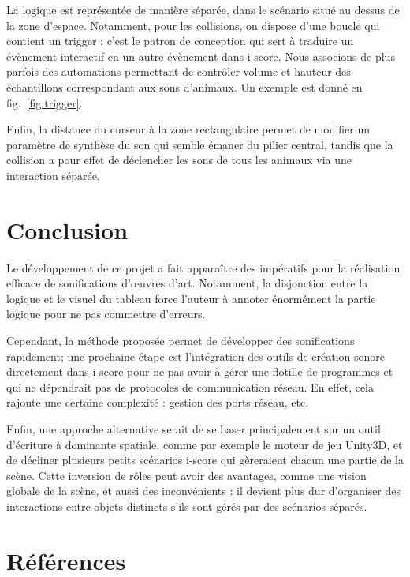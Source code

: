 \documentclass{article}
\begin{document}
    La logique est représentée de manière séparée, dans le scénario situé au dessus de la zone d'espace.
    Notamment, pour les collisions, on dispose d'une boucle qui contient un trigger : c'est le patron de conception qui sert à traduire un évènement interactif en un autre évènement dans i-score. Nous associons de plus parfois des automations permettant de contrôler volume et hauteur des échantillons correspondant aux sons d'animaux. 
    Un exemple est donné en fig.~\ref{fig.trigger}.
    
    Enfin, la distance du curseur à la zone rectangulaire permet de modifier un paramètre de synthèse du son qui semble émaner du pilier central, tandis que la collision a pour effet de déclencher les sons de tous les animaux via une interaction séparée.
    
    \section*{Conclusion}
    Le développement de ce projet a fait apparaître des impératifs pour la réalisation efficace de sonifications d'\oe uvres d'art. 
    Notamment, la disjonction entre la logique et le visuel du tableau force l'auteur à annoter énormément la partie logique pour ne pas commettre d'erreurs.
    
    Cependant, la méthode proposée permet de développer des sonifications rapidement; une prochaine étape est l'intégration des outils de création sonore directement dans i-score pour ne pas avoir à gérer une flotille de programmes et qui ne dépendrait pas de protocoles de communication réseau. En effet, cela rajoute une certaine complexité : gestion des ports réseau, etc.
    
    Enfin, une approche alternative serait de se baser principalement sur un outil d'écriture à dominante spatiale, comme par exemple le moteur de jeu Unity3D, et de décliner plusieurs petits scénarios i-score qui gèreraient chacun une partie de la scène. 
    Cette inversion de rôles peut avoir des avantages, comme une vision globale de la scène, et aussi des inconvénients : il devient plus dur d'organiser des interactions entre objets distincts s'ils sont gérés par des scénarios séparés.
    
    \section*{Références}
    
    
    \newpage{}
    
    
\end{document}
